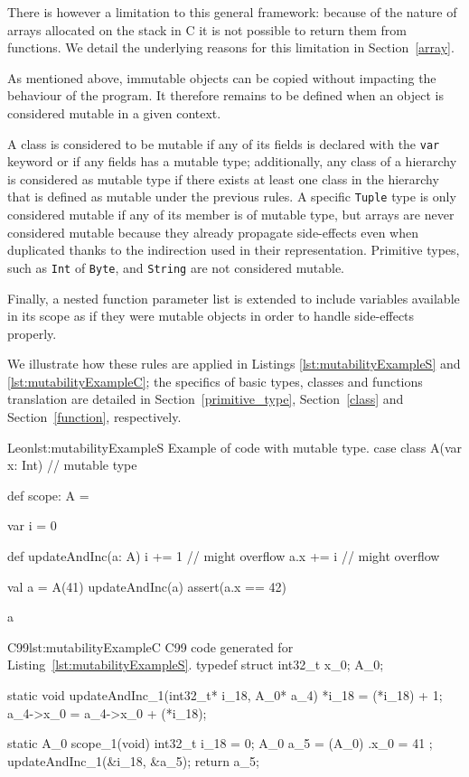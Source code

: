 \documentclass[a4paper,twoside]{article}
\newcommand{\InlineS}[1]{\lstinline[language=Leon]|#1|}
\newcommand{\RefSec}[1]{Section~\ref{#1}}
\newcommand{\RefCode}[1]{Listing~\ref{#1}}
\begin{document}
There is however a limitation to this general framework: because of the nature
of arrays allocated on the stack in C it is not possible to return them from
functions. We detail the underlying reasons for this limitation in
\RefSec{array}.

As mentioned above, immutable objects can be copied without impacting the
behaviour of the program. It therefore remains to be defined when an object is
considered mutable in a given context.

A class is considered to be mutable if any of its fields is declared with the
\InlineS{var} keyword or if any fields has a mutable type; additionally, any
class of a hierarchy is considered as mutable type if there exists at least one
class in the hierarchy that is defined as mutable under the previous rules. A
specific \InlineS{Tuple} type is only considered mutable if any of its member is
of mutable type, but arrays are never considered mutable because they already
propagate side-effects even when duplicated thanks to the indirection used in
their representation. Primitive types, such as \InlineS{Int} of \InlineS{Byte},
and \InlineS{String} are not considered mutable.

Finally, a nested function parameter list is extended to include variables
available in its scope as if they were mutable objects in order to handle
side-effects properly.

We illustrate how these rules are applied in Listings
\ref{lst:mutabilityExampleS} and \ref{lst:mutabilityExampleC}; the specifics of
basic types, classes and functions translation are detailed in
\RefSec{primitive_type}, \RefSec{class} and \RefSec{function}, respectively.

\begin{Code}{Leon}{lst:mutabilityExampleS}{%
Example of code with mutable type.}
case class A(var x: Int) // mutable type

def scope: A = {
  var i = 0

  def updateAndInc(a: A) {
    i += 1   // might overflow
    a.x += i // might overflow
  }

  val a = A(41)
  updateAndInc(a)
  assert(a.x == 42)

  a
}
\end{Code}

\begin{Code}{C99}{lst:mutabilityExampleC}{%
C99 code generated for \RefCode{lst:mutabilityExampleS}.}
typedef struct { int32_t x_0; } A_0;

static void updateAndInc_1(int32_t* i_18, A_0* a_4) {
    *i_18 = (*i_18) + 1;
    a_4->x_0 = a_4->x_0 + (*i_18);
}

static A_0 scope_1(void) {
    int32_t i_18 = 0;
    A_0 a_5 = (A_0) { .x_0 = 41 };
    updateAndInc_1(&i_18, &a_5);
    return a_5;
}
\end{Code}
\end{document}
